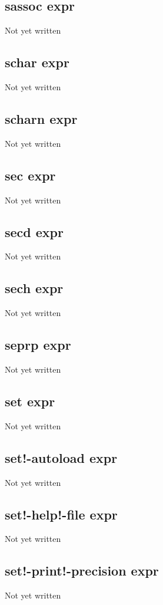 \documentclass[a4paper,11pt]{article}
\begin{document}
{\subsection{\ttfamily sassoc expr}
Not yet written

\subsection{\ttfamily schar expr}
Not yet written

\subsection{\ttfamily scharn expr}
Not yet written

\subsection{\ttfamily sec expr}
Not yet written

\subsection{\ttfamily secd expr}
Not yet written

\subsection{\ttfamily sech expr}
Not yet written

\subsection{\ttfamily seprp expr}
Not yet written

\subsection{\ttfamily set expr}
Not yet written

\subsection{\ttfamily set!-autoload expr}
Not yet written

\subsection{\ttfamily set!-help!-file expr}
Not yet written

\subsection{\ttfamily set!-print!-precision expr}
Not yet written

}
\end{document}
